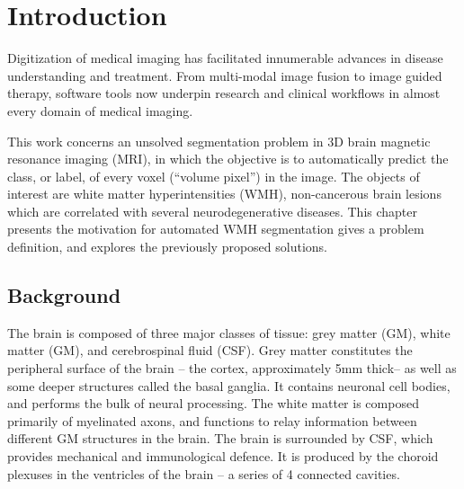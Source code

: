 \chapter{Introduction}
Digitization of medical imaging has facilitated
innumerable advances in disease understanding and treatment.
From multi-modal image fusion to image guided therapy, software tools now underpin
research and clinical workflows in almost every domain of medical imaging.
\par
This work concerns an unsolved segmentation problem in 3D brain magnetic resonance imaging (MRI),
in which the objective is to automatically predict the
class, or label, of every voxel (``volume pixel'') in the image.
The objects of interest are white matter hyperintensities (WMH),
non-cancerous brain lesions which are correlated with several neurodegenerative diseases.
This chapter presents the motivation for automated WMH segmentation
gives a problem definition, and explores the previously proposed solutions.
\section{Background}
The brain is composed of three major classes of tissue:
grey matter (GM), white matter (GM), and cerebrospinal fluid (CSF).
Grey matter constitutes the peripheral surface of the brain
-- the cortex, approximately 5mm thick-- as well as some deeper structures called the basal ganglia.
It contains neuronal cell bodies, and performs the bulk of neural processing.
The white matter is composed primarily of myelinated axons,
and functions to relay information between different GM structures in the brain.
The brain is surrounded by CSF, which provides mechanical and immunological defence.
It is produced by the choroid plexuses in the ventricles of the brain
-- a series of 4 connected cavities.
